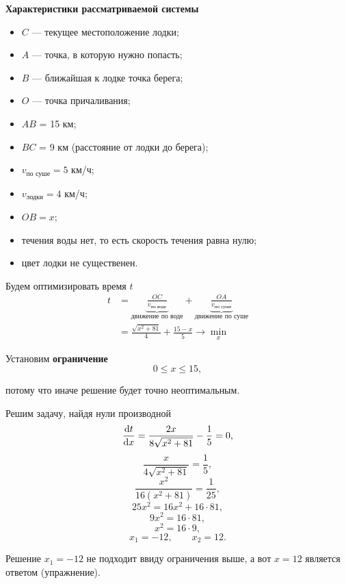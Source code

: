 \textbf{Характеристики рассматриваемой системы}
\begin{itemize}[nosep]
	\item $C$ --- текущее местоположение лодки;
	
	\item $A$ --- точка, в которую нужно попасть;
	
	\item $B$ --- ближайшая к лодке точка берега;
	
	\item $O$ --- точка причаливания;
	
	\item $AB$ = 15 км;
	
	\item $BC$ = 9 км (расстояние от лодки до берега);
	
	\item $v_{\text{по суше}} = 5$ км/ч;
	
	\item $v_{\text{лодки}} = 4$ км/ч;
	
	\item $OB = x$;
	
	\item течения воды нет, то есть скорость течения равна нулю;
	
	\item цвет лодки не существенен.
\end{itemize}

\bigskip

Будем оптимизировать время $t$
\begin{align*}
	t &= \underbrace{\frac{OC}{v_{\text{по воде}}}}_{\text{движение по воде}} + \underbrace{\frac{OA}{v_{\text{по суше}}}}_{\text{движение по суше}} \\
	&= \boxed{\frac{\sqrt{x^2+81}}{4} + \frac{15 - x}{5} \to \min_x}
\end{align*}

Установим \textbf{ограничение}
\[
0 \le x \le 15,
\]

потому что иначе решение будет точно неоптимальным.

\bigskip

Решим задачу, найдя нули производной
\[\derivative{t}{x} = \frac{2x}{8\sqrt{x^2+81}} - \frac{1}{5} = 0,\]
\[\frac{x}{4\sqrt{x^2+81}} = \frac{1}{5},\]
\[\frac{x^2}{16(x^2 + 81)} = \frac{1}{25},\]
\[	25x^2 = 16x^2 + 16 \cdot 81,\]
\[9x^2 = 16 \cdot 81,\]
\[x^2 = 16 \cdot 9,\]
\[x_1 = -12, \qquad x_2 = 12.\]

Решение $x_1 = -12$ не подходит ввиду ограничения выше, а вот $\boxed{x = 12}$ является ответом (упражнение).

